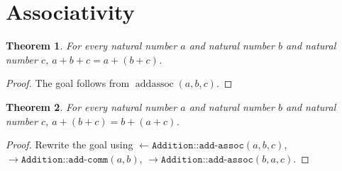 \documentclass[11pt]{article}
\newtheorem{theorem}{Theorem}[section]
\theoremstyle{definition}
\begin{document}
\section{Associativity}
\label{ll:addition:associativity}
\begin{theorem}
\label{ll:addition:add-assoc}
For every natural number \(a\) and natural number \(b\) and natural number \(c\), \(a + b + c = a + (b + c)\).
\end{theorem}
\begin{proof}
The goal follows from \(\operatorname{addassoc}(a, b, c)\).
\end{proof}
\begin{theorem}
\label{ll:addition:add-left-comm}
For every natural number \(a\) and natural number \(b\) and natural number \(c\), \(a + (b + c) = b + (a + c)\).
\end{theorem}
\begin{proof}
Rewrite the goal using \(\leftarrow \texttt{Addition::add-assoc}(a, b, c)\), \(\rightarrow \texttt{Addition::add-comm}(a, b)\), \(\rightarrow \texttt{Addition::add-assoc}(b, a, c)\).
\end{proof}
\end{document}
